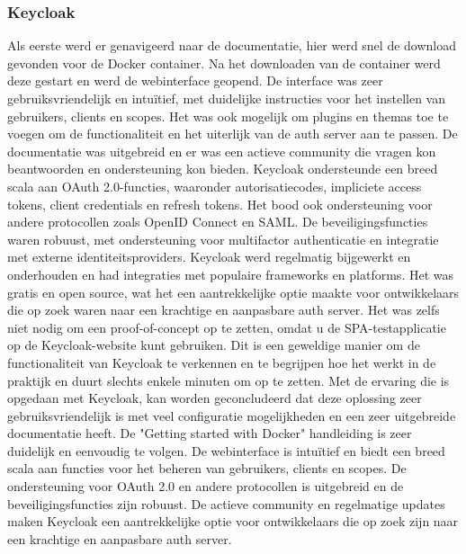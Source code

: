 \subsubsection{Keycloak}%
\label{subsubsec:keycloak}
Als eerste werd er genavigeerd naar de documentatie, hier werd snel de download gevonden voor de Docker container. Na het downloaden van de container werd deze gestart en werd de webinterface geopend. De interface was zeer gebruiksvriendelijk en intuïtief, met duidelijke instructies voor het instellen van gebruikers, clients en scopes. Het was ook mogelijk om plugins en themas toe te voegen om de functionaliteit en het uiterlijk van de auth server aan te passen. De documentatie was uitgebreid en er was een actieve community die vragen kon beantwoorden en ondersteuning kon bieden. Keycloak ondersteunde een breed scala aan OAuth 2.0-functies, waaronder autorisatiecodes, impliciete access tokens, client credentials en refresh tokens. Het bood ook ondersteuning voor andere protocollen zoals OpenID Connect en SAML. De beveiligingsfuncties waren robuust, met ondersteuning voor multifactor authenticatie en integratie met externe identiteitsproviders. Keycloak werd regelmatig bijgewerkt en onderhouden en had integraties met populaire frameworks en platforms. Het was gratis en open source, wat het een aantrekkelijke optie maakte voor ontwikkelaars die op zoek waren naar een krachtige en aanpasbare auth server.
Het was zelfs niet nodig om een proof-of-concept op te zetten, omdat u de SPA-testapplicatie op de Keycloak-website kunt gebruiken. Dit is een geweldige manier om de functionaliteit van Keycloak te verkennen en te begrijpen hoe het werkt in de praktijk en duurt slechts enkele minuten om op te zetten.
Met de ervaring die is opgedaan met Keycloak, kan worden geconcludeerd dat deze oplossing zeer gebruiksvriendelijk is met veel configuratie mogelijkheden en een zeer uitgebreide documentatie heeft. De "Getting started with Docker" handleiding is zeer duidelijk en eenvoudig te volgen. De webinterface is intuïtief en biedt een breed scala aan functies voor het beheren van gebruikers, clients en scopes. De ondersteuning voor OAuth 2.0 en andere protocollen is uitgebreid en de beveiligingsfuncties zijn robuust. De actieve community en regelmatige updates maken Keycloak een aantrekkelijke optie voor ontwikkelaars die op zoek zijn naar een krachtige en aanpasbare auth server.

